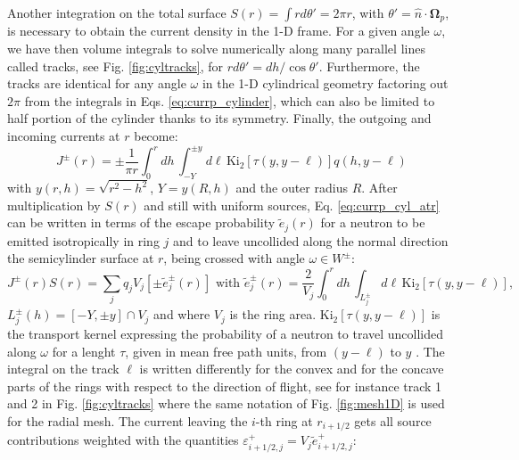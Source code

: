 \documentclass{ictt26}
\begin{document}
Another integration on the total surface $S(r) = \int{r d\theta'} = 2\pi r$, with $\theta' = \hat{n}\cdot \mathbf{\Omega}_p$, is necessary to obtain the current density in the 1-D frame. For a given angle $\omega$, we have then volume integrals to solve numerically along many parallel lines called tracks, see Fig. \ref{fig:cyltracks}, for $r d\theta' = dh/\cos \theta'$. Furthermore, the tracks are identical for any angle $\omega$ in the 1-D cylindrical geometry factoring out $2\pi$ from the integrals in Eqs. \ref{eq:currp_cylinder}, which can also be limited to half portion of the cylinder thanks to its symmetry. Finally, the outgoing and incoming currents at $r$ become:
\begin{equation}
J^\pm(r) = \pm \frac{1}{\pi r} \int_0^r { dh\,
    \int_{-Y}^{\pm y}{d \ell \,
      \text{Ki}_2\left[\tau( y, y - \ell )\right] q(h, y - \ell)}}
\label{eq:currp_cyl_atr}
\end{equation}
with $y(r,h) =\sqrt{r^2 - h^2}$, $Y = y(R,h)$ and the outer radius $R$. After multiplication by $S(r)$ and still with uniform sources, Eq. \ref{eq:currp_cyl_atr} can be written in terms of the escape probability $\tilde{e}_{j}(r)$ for a neutron to be emitted isotropically in ring $j$ and to leave uncollided along the normal direction the semicylinder surface at $r$, being crossed with angle $\omega \in W^\pm$:
\begin{equation}
J^\pm(r)S(r) = \sum_j q_j V_j \left[ \pm \tilde{e}^\pm_j(r) \right] \mbox{ with }
\tilde{e}^\pm_j(r) = \frac{2}{V_j} \int_0^r { dh\,
  \int_{L^\pm_j}{d \ell \, \text{Ki}_2\left[\tau( y, y - \ell )\right]}},
\label{eq:esc_prob_cyl}
\end{equation}
$L^\pm_j(h) = [-Y,\pm y] \cap V_j$ and where $V_j$ is the ring area. $\text{Ki}_2\left[\tau( y, y - \ell )\right]$ is the transport kernel expressing the probability of a neutron to travel uncollided along $\omega$ for a lenght $\tau$, given in mean free path units, from $(y - \ell)$ to $y$ \cite{stamm1983methods}. The integral on the track $\ell$ is written differently for the convex and for the concave parts of the rings with respect to the direction of flight, see for instance track 1 and 2 in Fig. \ref{fig:cyltracks} where the same notation of Fig. \ref{fig:mesh1D} is used for the radial mesh. The current leaving the $i$-th ring at $r_{i+1/2}$ gets all source contributions weighted with the quantities $\varepsilon^+_{i+1/2,j} = V_j \tilde{e}^+_{i+1/2,j}$:
%
\newlength{\plussign}
\end{document}
